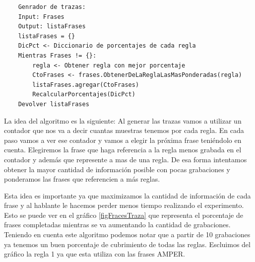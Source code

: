 \documentclass[11pt,a4paper,twoside]{tesis}
\begin{document}
\begin{lstlisting}
    Genrador de trazas:
    Input: Frases
    Output: listaFrases 
    listaFrases = {}
    DicPct <- Diccionario de porcentajes de cada regla
    Mientras Frases != {}:
    	regla <- Obtener regla con mejor porcentaje
    	CtoFrases <- frases.ObtenerDeLaReglaLasMasPonderadas(regla)
    	listaFrases.agregar(CtoFrases)
    	RecalcularPorcentajes(DicPct)
    Devolver listaFrases
\end{lstlisting}

La idea del algoritmo es la siguiente: Al generar las trazas vamos a utilizar un contador que nos va a decir cuantas muestras tenemos por cada regla. En cada paso vamos a ver ese contador y vamos a elegir la próxima frase teniéndolo en cuenta. Elegiremos la frase que haga referencia a la regla menos grabada en el contador y además que represente a mas de una regla. De esa forma intentamos obtener la mayor cantidad de información posible con pocas grabaciones y ponderamos las frases que referencien a más reglas. 

Esta idea es importante ya que maximizamos la cantidad de información de cada frase y al hablante le hacemos perder menos tiempo realizando el experimento. Esto se puede ver en el gráfico \ref{figFracesTraza} que representa el porcentaje de frases completadas mientras se va aumentando la cantidad de grabaciones. Teniendo en cuenta este algoritmo podemos notar que a partir de 10 grabaciones ya tenemos un buen porcentaje de cubrimiento de todas las reglas. Escluimos del gráfico la regla 1 ya que esta utiliza con las frases AMPER.
\end{document}
